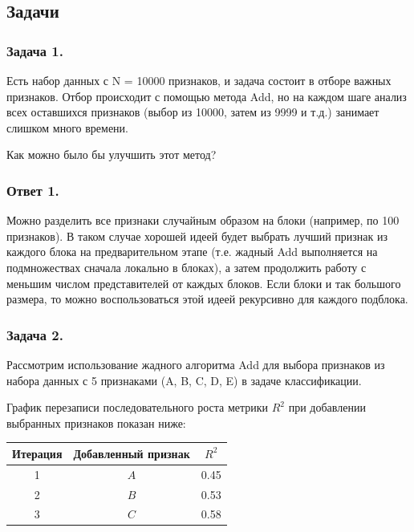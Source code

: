 \subsection{Задачи}

\subsubsection{Задача 1.}

Есть набор данных с N = 10000 признаков, и задача состоит в отборе важных признаков. Отбор происходит с помощью метода Add, но на каждом шаге анализ всех оставшихся признаков (выбор из 10000, затем из 9999 и т.д.) занимает слишком много времени.

Как можно было бы улучшить этот метод?

\subsubsection{Ответ 1.}

Можно разделить все признаки случайным образом на блоки (например, по 100 признаков). В таком случае хорошей идеей будет выбрать лучший признак из каждого блока на предварительном этапе (т.е. жадный Add выполняется на подмножествах сначала локально в блоках), а затем продолжить работу с меньшим числом представителей от каждых блоков. Если блоки и так большого размера, то можно воспользоваться этой идеей рекурсивно для каждого подблока.

\subsubsection{Задача 2.}

Рассмотрим использование жадного алгоритма Add для выбора признаков из набора данных с 5 признаками ({A, B, C, D, E}) в задаче классификации.

График перезаписи последовательного роста метрики $R^2$ при добавлении выбранных признаков показан ниже:

\begin{table}[h!]
\centering
\begin{tabular}{|c|c|c|}
\hline
\textbf{Итерация} & \textbf{Добавленный признак} & \boldmath${R^2}$ \\ \hline
1                 & $A$                       & 0.45             \\ \hline
2                 & $B$                       & 0.53             \\ \hline
3                 & $C$                       & 0.58             \\ \hline
\end{tabular}
\end{table}

